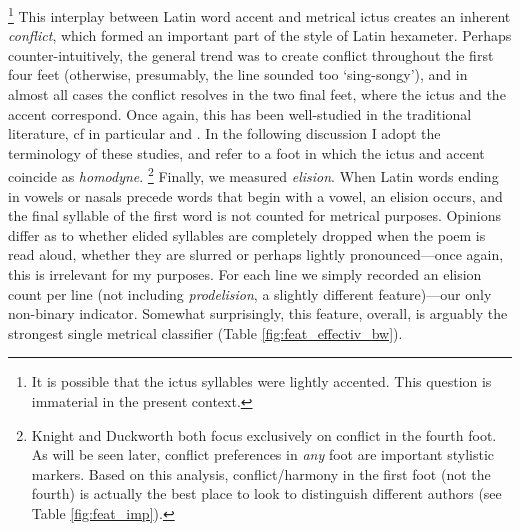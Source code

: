 \documentclass[11pt,a4paper]{scrartcl} %
\begin{document}
\footnote{It is possible that the ictus syllables were lightly accented. This question is immaterial in the present context.}
This interplay between Latin word accent and metrical ictus creates an inherent \textit{conflict}, which formed an important part of the style of Latin hexameter. Perhaps counter-intuitively, the general trend was to create conflict throughout the first four feet (otherwise, presumably, the line sounded too `sing-songy'), and in almost all cases the conflict resolves in the two final feet, where the ictus and the accent correspond. Once again, this has been well-studied in the traditional literature, cf in particular \cite{knight_homodyne_1931} and \citet[17-24]{duckworth_vergil_1969}. In the following discussion I adopt the terminology of these studies, and refer to a foot in which the ictus and accent coincide as \textit{homodyne}.%
\footnote{Knight and Duckworth both focus exclusively on conflict in the fourth foot. As will be seen later, conflict preferences in \textit{any} foot are important stylistic markers. Based on this analysis, conflict/harmony in the first foot (not the fourth) is actually the best place to look to distinguish different authors (see Table \ref{fig:feat_imp}).}
Finally, we measured \textit{elision}. When Latin words ending in vowels or nasals precede words that begin with a vowel, an elision occurs, and the final syllable of the first word is not counted for metrical purposes. Opinions differ as to whether elided syllables are completely dropped when the poem is read aloud, whether they are slurred or perhaps lightly pronounced---once again, this is irrelevant for my purposes. For each line we simply recorded an elision count per line (not including \textit{prodelision}, a slightly different feature)---our only non-binary indicator. Somewhat surprisingly, this feature, overall, is arguably the strongest single metrical classifier (Table \ref{fig:feat_effectiv_bw}).
\end{document}
